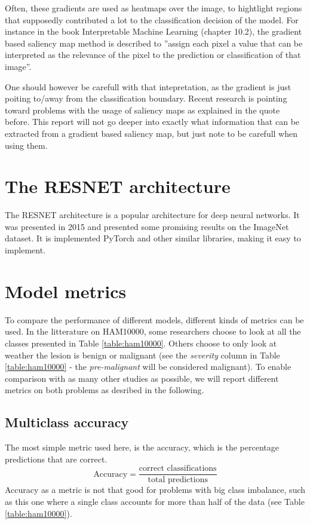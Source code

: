 Often, these gradients are used as heatmaps over the image, to hightlight regions that
supposedly contributed a lot to the classification decision of the model.
For instance in the book Interpretable Machine Learning (chapter 10.2)\cite{interpretable-machine-learning}, the gradient based
saliency map method is described to
''assign each pixel a value that can be interpreted as the relevance of the pixel to the prediction or classification of that image''.

One should however be carefull with that intepretation, as the gradient is just poiting to/away from the classification boundary.
Recent research is pointing toward problems with the usage of saliency maps as explained in the quote before\cite{false-hope}.
This report will not go deeper into exactly what information that can be extracted from a gradient based saliency map,
but just note to be carefull when using them.

\section{The RESNET architecture}
The RESNET architecture is a popular architecture for deep neural networks.
It was presented in 2015 and presented some promising results on the ImageNet dataset\cite{RESNET-paper}.
It is implemented PyTorch and other similar libraries, making it easy to implement.

\section{Model metrics} \label{sec:model_metrics}
To compare the performance of different models, different kinds of metrics can be used.
In the litterature on HAM10000, some researchers choose to look at all the classes presented
in Table \ref{table:ham10000}.
Others choose to only look at weather the lesion is benign or malignant
(see the \textit{severity} column in Table \ref{table:ham10000} - the \textit{pre-malignant} will be considered malignant).
To enable comparison with as many other studies as possible, we will report different metrics
on both problems as desribed in the following.
\subsection{Multiclass accuracy}
The most simple metric used here, is the accuracy, which is the percentage predictions that are correct.
\[
    \text{Accuracy} = \frac{\text{correct classifications}}{\text{total predictions}}
\]
Accuracy as a metric is not that good for problems with big class imbalance,
such as this one where a single class accounts for more than half of the data (see Table \ref{table:ham10000}).

